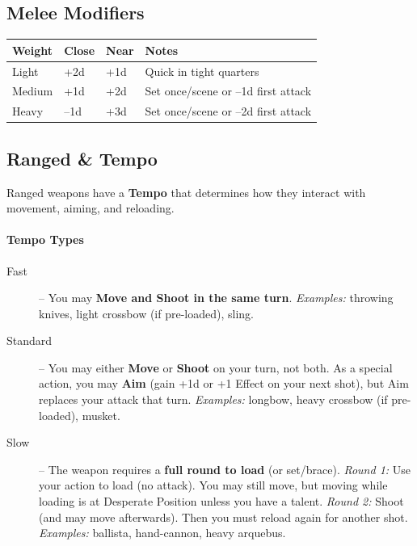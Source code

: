 \subsection{Melee Modifiers}
\label{sec:melee-modifiers}
\begin{center}
\begin{tabular}{llll}
\toprule
\textbf{Weight} & \textbf{Close} & \textbf{Near} & \textbf{Notes} \\
\midrule
Light & +2d & +1d & Quick in tight quarters \\
Medium & +1d & +2d & Set once/scene or --1d first attack \\
Heavy & --1d & +3d & Set once/scene or --2d first attack \\
\bottomrule
\end{tabular}
\end{center}

\subsection{Ranged \& Tempo}
\label{sec:ranged-tempo}
Ranged weapons have a \textbf{Tempo} that determines how they interact with movement, aiming, and reloading.

\paragraph{Tempo Types}
\begin{description}
  \item[Fast] -- You may \textbf{Move and Shoot in the same turn}.  
        \textit{Examples:} throwing knives, light crossbow (if pre-loaded), sling.
  \item[Standard] -- You may either \textbf{Move} or \textbf{Shoot} on your turn, not both.  
        As a special action, you may \textbf{Aim} (gain +1d or +1 Effect on your next shot), but Aim replaces your attack that turn.  
        \textit{Examples:} longbow, heavy crossbow (if pre-loaded), musket.
  \item[Slow] -- The weapon requires a \textbf{full round to load} (or set/brace).  
        \textit{Round 1:} Use your action to load (no attack). You may still move, but moving while loading is at Desperate Position unless you have a talent.  
        \textit{Round 2:} Shoot (and may move afterwards). Then you must reload again for another shot.  
        \textit{Examples:} ballista, hand-cannon, heavy arquebus.
\end{description}

